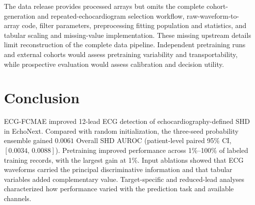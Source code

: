 The data release provides processed arrays but omits the complete cohort-generation and repeated-echocardiogram selection workflow, raw-waveform-to-array code, filter parameters, preprocessing fitting population and statistics, and tabular scaling and missing-value implementation. These missing upstream details limit reconstruction of the complete data pipeline. Independent pretraining runs and external cohorts would assess pretraining variability and transportability, while prospective evaluation would assess calibration and decision utility.

\FloatBarrier
\section{Conclusion}
\label{sec:conclusion}

ECG-FCMAE improved 12-lead ECG detection of echocardiography-defined SHD in EchoNext. Compared with random initialization, the three-seed probability ensemble gained $0.0061$ Overall SHD AUROC (patient-level paired 95\% CI, $[0.0034,\,0.0088]$). Pretraining improved performance across 1\%--100\% of labeled training records, with the largest gain at 1\%. Input ablations showed that ECG waveforms carried the principal discriminative information and that tabular variables added complementary value. Target-specific and reduced-lead analyses characterized how performance varied with the prediction task and available channels.
